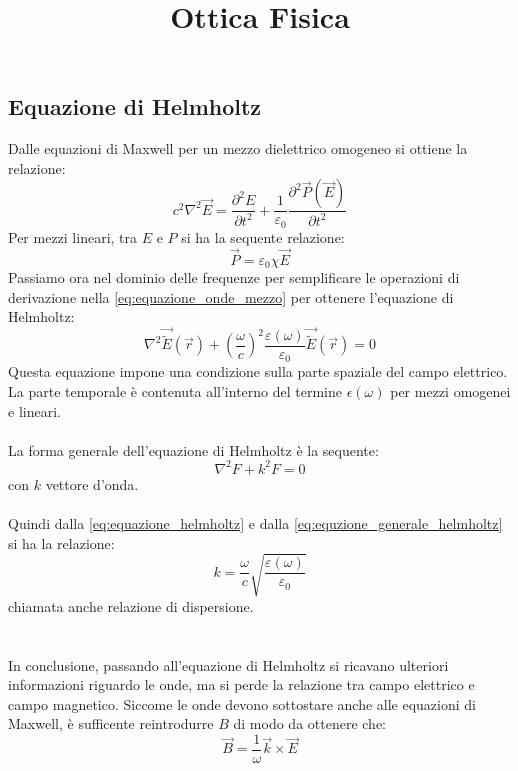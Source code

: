 \documentclass{article}
\title{Ottica Fisica}
\author{}
\date{}
\begin{document}
\maketitle

\subsection*{Equazione di Helmholtz}
Dalle equazioni di Maxwell per un mezzo dielettrico omogeneo si ottiene la relazione:
\begin{equation} \label{eq:equazione_onde_mezzo}
c^2\nabla^2 \overrightarrow{E} = \frac{\partial^2 E}{\partial t^2} + \frac{1}{\varepsilon_0} \frac{\partial^2 \overrightarrow{P}(\overrightarrow{E})}{\partial t^2}
\end{equation}
Per mezzi lineari, tra $E$ e $P$ si ha la sequente relazione:
\begin{equation*}
\overrightarrow{P} = \varepsilon_0 \chi \overrightarrow{E}
\end{equation*}
Passiamo ora nel dominio delle frequenze per semplificare le operazioni di derivazione nella \eqref{eq:equazione_onde_mezzo} per ottenere l'equazione di Helmholtz:
\begin{equation}	\label{eq:equazione_helmholtz}
\nabla^2 \overrightarrow{\tilde{E}}(\overrightarrow{r}) + \left(\frac{\omega}{c}\right)^2 \frac{\varepsilon(\omega)}{\varepsilon_0} \overrightarrow{\tilde{E}}(\overrightarrow{r}) = 0
\end{equation}
Questa equazione impone una condizione sulla parte spaziale del campo elettrico. La parte temporale è contenuta all'interno del termine $\epsilon(\omega)$ per mezzi omogenei e lineari.\\
\\
La forma generale dell'equazione di Helmholtz è la sequente:
\begin{equation} 	\label{eq:equzione_generale_helmholtz}
\nabla^2 F + k^2 F = 0
\end{equation}
con $k$ vettore d'onda.\\
\\
Quindi dalla \eqref{eq:equazione_helmholtz} e dalla \eqref{eq:equzione_generale_helmholtz} si ha la relazione:
\begin{equation*}
k = \frac{\omega}{c} \sqrt{\frac{\varepsilon(\omega)}{\varepsilon_0}}
\end{equation*}
chiamata anche relazione di dispersione.\\
\\
\\
In conclusione, passando all'equazione di Helmholtz si ricavano ulteriori informazioni riguardo le onde, ma si perde la relazione tra campo elettrico e campo magnetico. Siccome le onde devono sottostare anche alle equazioni di Maxwell, è sufficente reintrodurre $B$ di modo da ottenere che:
\begin{equation*}
\overrightarrow{B} = \frac{1}{\omega} \overrightarrow{k} \times \overrightarrow{E}
\end{equation*}
\end{document}
